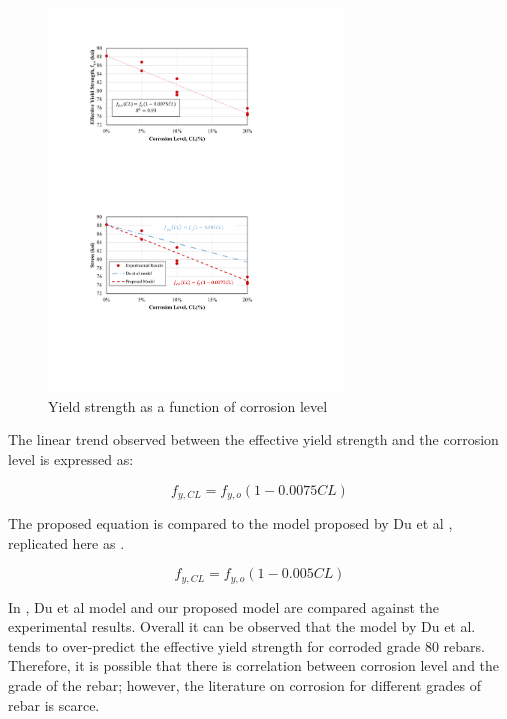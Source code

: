\begin{figure}[htbp]
	\centering
	\includegraphics[width=0.7\textwidth]{VAC Thesis 2.0/Chapter-4/figs/TensionTest_results_2.pdf}
	\caption{Yield strength as a function of corrosion level}
	\label{fig:YieldStrength_vs_CL}
\end{figure}

The linear trend observed between the effective yield strength and the corrosion level is expressed as:

\begin{equation}
    f_{y,CL} = f_{y,o}(1-0.0075CL)
    \label{eq.Calderon_Fy_vs_CL}
\end{equation}

The proposed equation is compared to the model proposed by Du et al \cite{Du2005}, replicated here as . 

\begin{equation}
    f_{y,CL} = f_{y,o}(1-0.005CL)
\label{eq.Du_Fy_vs_CL_ch4}
\end{equation}

In , Du et al model  and our proposed model  are compared against the experimental results. Overall it can be observed that the model by Du et al. \cite{Du2005} tends to over-predict the effective yield strength for corroded grade 80 rebars. Therefore, it is possible that there is correlation between corrosion level and the grade of the rebar; however, the literature on corrosion for different grades of rebar is scarce. 

